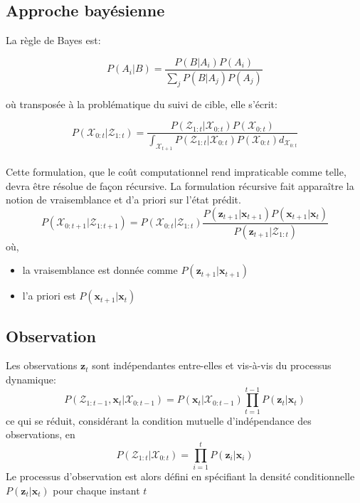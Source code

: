 \documentclass[a4paper,12pt]{report}
\begin{document}
\subsection{Approche bayésienne}
La règle de Bayes est:

$$P(A_i|B) = \frac{P(B | A_i) P(A_i)}{\sum_j P(B|A_j)P(A_j)}$$

où transposée à la problématique du suivi de cible, elle s'écrit:

$$P(\mathcal{X}_{0:t}|\mathcal{Z}_{1:t}) =  \frac{P(\mathcal{Z}_{1:t}|\mathcal{X}_{0:t})P(\mathcal{X}_{0:t})}{\int_{\mathcal{X}_{t+1}}P(\mathcal{Z}_{1:t}|\mathcal{X}_{0:t})P(\mathcal{X}_{0:t})d_{\mathcal{X}_{0:t}}}$$\\

Cette formulation, que le coût computationnel rend impraticable comme telle, devra être résolue de façon récursive. 
La formulation récursive fait apparaître la notion de vraisemblance et d'a priori sur l'état prédit.
$$P(\mathcal{X}_{0:t+1}|\mathcal{Z}_{1:t+1}) = P(\mathcal{X}_{0:t}|\mathcal{Z}_{1:t})\frac{P(\mathbf{z}_{t+1}|\mathbf{x}_{t+1})P(\mathbf{x}_{t+1}|\mathbf{x}_{t})}{P(\mathbf{z}_{t+1}|\mathcal{Z}_{1:t})}$$
où,
\begin{itemize}
\item[] la vraisemblance est donnée comme $P(\mathbf{z}_{t+1}|\mathbf{x}_{t+1})$
\item[] l'a priori est $P(\mathbf{x}_{t+1}|\mathbf{x}_{t})$\\
\end{itemize}

\subsection{Observation}
Les observations $\mathbf{z}_t$ sont indépendantes entre-elles et vis-à-vis du processus dynamique:
$$P(\mathcal{Z}_{1:t-1},\mathbf{x}_t|\mathcal{X}_{0:t-1}) = P(\mathbf{x}_t|\mathcal{X}_{0:t-1})\prod_{t=1}^{t-1} P(\mathbf{z}_t|\mathbf{x}_t)$$
ce qui se réduit, considérant la condition mutuelle d'indépendance des observations, en
$$P(\mathcal{Z}_{1:t}|\mathcal{X}_{0:t}) = \prod_{i=1}^{t} P(\mathbf{z}_i|\mathbf{x}_i)$$
Le processus d'observation est alors défini en spécifiant la densité conditionnelle $P(\mathbf{z}_t|\mathbf{x}_t)$ pour chaque instant $t$
\end{document}
